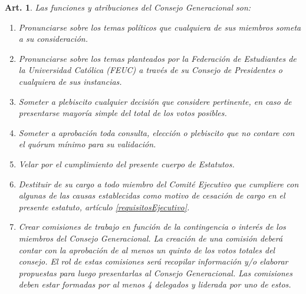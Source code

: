 \documentclass[letterpaper,11pt]{article}
\theoremstyle{plain}
\newtheorem{art}{Art.} %
\begin{document}
		\begin{art}\label{funcionesConsejoGeneracional}
			Las funciones y atribuciones del Consejo Generacional son:
			\begin{enumerate}
				\item Pronunciarse sobre los temas políticos que cualquiera de sus miembros someta a su consideración.
				\item Pronunciarse sobre los temas planteados por la Federación de Estudiantes de la Universidad Católica (FEUC) a través de su Consejo de Presidentes o cualquiera de sus instancias.
				\item Someter a plebiscito cualquier decisión que considere pertinente, en caso de presentarse mayoría simple del total de los votos posibles.
				\item Someter a aprobación toda consulta, elección o plebiscito que no contare con el quórum mínimo para su validación.
				\item Velar por el cumplimiento del presente cuerpo de Estatutos.
				\item Destituir de su cargo a todo miembro del Comité Ejecutivo que cumpliere con algunas de las causas establecidas como motivo de cesación de cargo en el presente estatuto, artículo \ref{requisitosEjecutivo}.
				\item  Crear comisiones de trabajo en función de la contingencia o interés de los miembros del Consejo Generacional. La creación de una comisión deberá contar con la aprobación de al menos un quinto de los votos totales del consejo. El rol de estas comisiones será recopilar información y/o elaborar propuestas para luego presentarlas al Consejo Generacional. Las comisiones deben estar formadas por al menos 4 delegados y liderada por uno de estos.
			\end{enumerate}
		\end{art}
\end{document}
